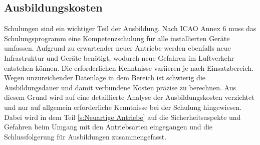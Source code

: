 \subsection{Ausbildungskosten}
%
Schulungen sind ein wichtiger Teil der Ausbildung. 
Nach ICAO Annex 6 muss das Schulungsprogramm eine Kompetenzschulung für alle installierten Geräte umfassen.
Aufgrund zu erwartender neuer Antriebe werden ebenfalls neue Infrastruktur und Geräte benötigt, 
wodurch neue Gefahren im Luftverkehr entstehen können. %
Die erforderlichen Kenntnisse variieren je nach Einsatzbereich.
%
Wegen unzureichender Datenlage in dem Bereich ist schwierig die 
Ausbildungsdauer und damit verbundene Kosten präzise zu berechnen.
Aus diesem Grund wird auf eine detaillierte Analyse der Ausbildungskosten verzichtet 
und nur auf allgemein erforderliche Kenntnisse bei der Schulung hingewiesen.
Dabei wird in dem Teil \ref{s:Neuartige Antriebe} auf die Sicherheitsaspekte und Gefahren 
beim Umgang mit den Antriebsarten eingegangen und %
die Schlussfolgerung für Ausbildungen zusammengefasst. %


